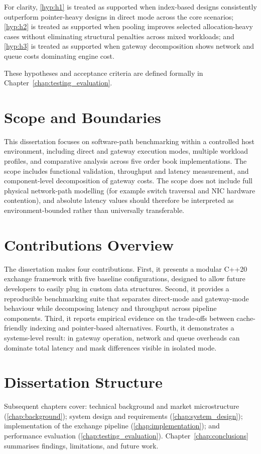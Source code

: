 For clarity, \ref{hyp:h1} is treated as supported when index-based designs
consistently outperform pointer-heavy designs in direct mode across the core
scenarios; \ref{hyp:h2} is treated as supported when pooling improves selected
allocation-heavy cases without eliminating structural penalties across mixed
workloads; and \ref{hyp:h3} is treated as supported when gateway decomposition
shows network and queue costs dominating engine cost.

These hypotheses and acceptance criteria are defined formally in
Chapter~\ref{chap:testing_evaluation}.


\section{Scope and Boundaries}
This dissertation focuses on software-path benchmarking within a controlled host
environment, including direct and gateway execution modes, multiple workload
profiles, and comparative analysis across five order book implementations. The
scope includes functional validation, throughput and latency measurement, and
component-level decomposition of gateway costs. The scope does not include
full physical network-path modelling (for example switch traversal and NIC
hardware contention), and absolute latency values should therefore be interpreted
as environment-bounded rather than universally transferable.


\section{Contributions Overview}
The dissertation makes four contributions. First, it presents a modular C++20 
exchange framework with five baseline configurations, designed to allow future 
developers to easily plug in custom data structures. Second, it provides a 
reproducible benchmarking suite that separates direct-mode and gateway-mode 
behaviour while decomposing latency and throughput across pipeline components. 
Third, it reports empirical evidence on the trade-offs between cache-friendly 
indexing and pointer-based alternatives. Fourth, it demonstrates a 
systems-level result: in gateway operation, network and queue overheads can 
dominate total latency and mask differences visible in isolated mode.


\section{Dissertation Structure}
Subsequent chapters cover: technical background and market microstructure 
(\ref{chap:background}); system design and requirements 
(\ref{chap:system_design}); implementation of the exchange pipeline 
(\ref{chap:implementation}); and performance evaluation 
(\ref{chap:testing_evaluation}). Chapter~\ref{chap:conclusions} summarises 
findings, limitations, and future work.
